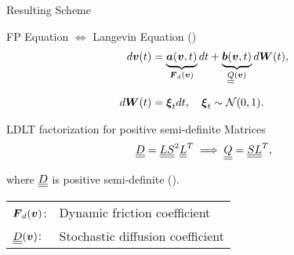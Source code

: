         
\begin{frame}{Resulting Scheme}


    \begin{block}{FP Equation $\Longleftrightarrow$ Langevin Equation
        (\cite{tabar2019})}
    \begin{align}
        d\vect v(t) &= \underbrace{\vect a(\vect v, t)}_{\vect F_d(\vect v)} dt + \underbrace{\vect
        b(\vect v, t)}_{\matr Q(\vect v)} d\vect W (t), \eqVspace
            d\vect W(t) &= \vect \xi_t dt, \quad \vect \xi_t \sim \mathcal N(0,1).
    \end{align}
    \end{block}

    \begin{exampleblock}{LDLT factorization for positive semi-definite Matrices}
        \begin{equation}
            \underline{\underline{D}} = \underline{\underline{L}} \underline{\underline{S}}^2 \underline{\underline{L}}^T \implies \underline{\underline{Q}} = \underline{\underline{S}} \underline{\underline{L}}^T, 
        \end{equation}
        \item where $\underline{\underline{D}}$ is positive semi-definite (\cite{hinton1983collisional}).
    \end{exampleblock}



    \vspace{2cm}
    \begin{definitionBlock}
         \begin{tabular}{ll}
             $\boldsymbol{F}_d(\boldsymbol{v})$: & Dynamic friction coefficient \\
             $\underline{\underline{D}}(\boldsymbol{v})$: & Stochastic diffusion coefficient
        \end{tabular}
    \end{definitionBlock}

\end{frame}

